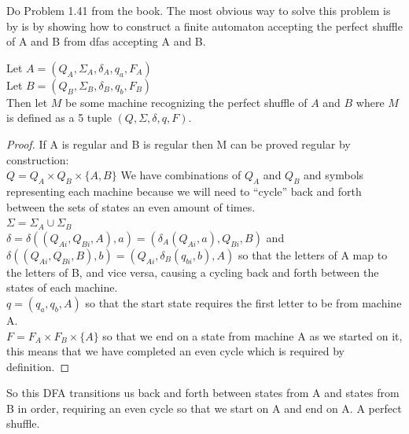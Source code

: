 \begin{problem}{3}
  Do Problem 1.41 from the book. The most obvious way to solve this problem is by is by showing how to construct a finite automaton accepting the perfect shuffle of A and B from dfas accepting A and B.

  \begin{solution}
    Let $A = (Q_A, \Sigma_A, \delta_A, q_a, F_A)$ \\
    Let $B = (Q_B, \Sigma_B, \delta_B, q_b, F_B)$ \\

    \noindent Then let $M$ be some machine recognizing the perfect shuffle of $A$ and $B$ where $M$ is defined as a
    5 tuple $(Q, \Sigma, \delta, q, F)$. \\

    \begin{proof}
      If A is regular and B is regular then M can be proved regular by construction: \\

          \noindent $Q = Q_A \times Q_B \times \{ A, B \}$ We have combinations of $Q_A$ and $Q_B$ and symbols representing each machine
          because we will need to ``cycle'' back and forth between the sets of states an even amount of times. \\

          \noindent $\Sigma = \Sigma_A \cup \Sigma_B$ \\

          \noindent $\delta = \delta((Q_{Ai}, Q_{Bi}, A), a) = (\delta_A(Q_{Ai}, a), Q_{Bi}, B)$ and $\delta((Q_{Ai}, Q_{Bi}, B), b) = (Q_{Ai}, \delta_B(q_{bi}, b), A)$ so that the letters of A map to the letters of B, and vice versa, causing a cycling back and forth between the states of each machine. \\

          \noindent $q = (q_a, q_b, A)$ so that the start state requires the first letter to be from machine A. \\

          \noindent $F = F_A \times F_B \times \{ A \}$ so that we end on a state from machine A as we started on it, this means that we have completed an even cycle which is required by definition.
    \end{proof}

    \noindent So this DFA transitions us back and forth between states from A and states from B in order, requiring an
    even cycle so that we start on A and end on A. A perfect shuffle.
  \end{solution}
\end{problem} \newpage

